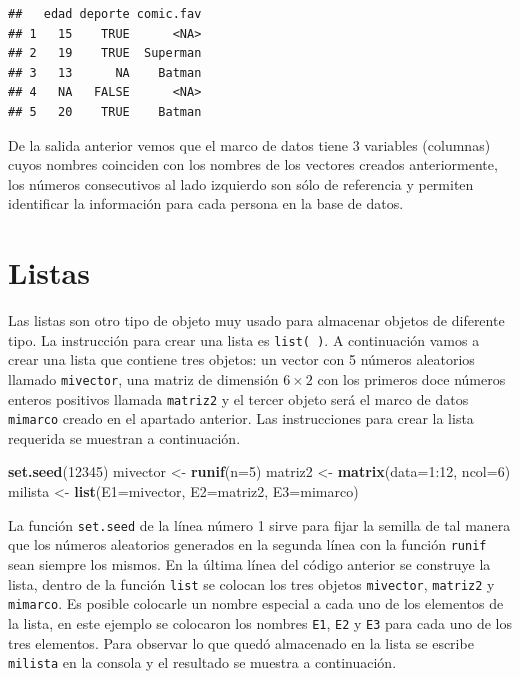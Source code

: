 \documentclass[10pt,]{krantz}
\makeatletter
\newenvironment{Shaded}{\begin{snugshade}}{\end{snugshade}}
\newcommand{\KeywordTok}[1]{\textcolor[rgb]{0.13,0.29,0.53}{\textbf{{#1}}}}
\newcommand{\DataTypeTok}[1]{\textcolor[rgb]{0.13,0.29,0.53}{{#1}}}
\newcommand{\DecValTok}[1]{\textcolor[rgb]{0.00,0.00,0.81}{{#1}}}
\newcommand{\StringTok}[1]{\textcolor[rgb]{0.31,0.60,0.02}{{#1}}}
\newcommand{\NormalTok}[1]{{#1}}
\newenvironment{kframe}{%
\medskip{}
\setlength{\fboxsep}{.8em}
 \def\at@end@of@kframe{}%
 \ifinner\ifhmode%
  \def\at@end@of@kframe{\end{minipage}}%
  \begin{minipage}{\columnwidth}%
 \fi\fi%
 \def\FrameCommand##1{\hskip\@totalleftmargin \hskip-\fboxsep
 \colorbox{shadecolor}{##1}\hskip-\fboxsep
     \hskip-\linewidth \hskip-\@totalleftmargin \hskip\columnwidth}%
 \MakeFramed {\advance\hsize-\width
   \@totalleftmargin\z@ \linewidth\hsize
   \@setminipage}}%
 {\par\unskip\endMakeFramed%
 \at@end@of@kframe}
\renewenvironment{Shaded}{\begin{kframe}}{\end{kframe}}
\makeatother
\begin{document}
\begin{verbatim}
##   edad deporte comic.fav
## 1   15    TRUE      <NA>
## 2   19    TRUE  Superman
## 3   13      NA    Batman
## 4   NA   FALSE      <NA>
## 5   20    TRUE    Batman
\end{verbatim}

De la salida anterior vemos que el marco de datos tiene 3 variables
(columnas) cuyos nombres coinciden con los nombres de los vectores
creados anteriormente, los números consecutivos al lado izquierdo son
sólo de referencia y permiten identificar la información para cada
persona en la base de datos.

\section{\texorpdfstring{Listas 
}{Listas  }}\label{listas}

Las listas son otro tipo de objeto muy usado para almacenar objetos de
diferente tipo. La instrucción para crear una lista es
\texttt{list(\ )}. A continuación vamos a crear una lista que contiene
tres objetos: un vector con 5 números aleatorios llamado
\texttt{mivector}, una matriz de dimensión \(6 \times 2\) con los
primeros doce números enteros positivos llamada \texttt{matriz2} y el
tercer objeto será el marco de datos \texttt{mimarco} creado en el
apartado anterior. Las instrucciones para crear la lista requerida se
muestran a continuación.

\begin{Shaded}
\begin{Highlighting}[]
\KeywordTok{set.seed}\NormalTok{(}\DecValTok{12345}\NormalTok{)}
\NormalTok{mivector <-}\StringTok{ }\KeywordTok{runif}\NormalTok{(}\DataTypeTok{n=}\DecValTok{5}\NormalTok{)}
\NormalTok{matriz2 <-}\StringTok{ }\KeywordTok{matrix}\NormalTok{(}\DataTypeTok{data=}\DecValTok{1}\NormalTok{:}\DecValTok{12}\NormalTok{, }\DataTypeTok{ncol=}\DecValTok{6}\NormalTok{)}
\NormalTok{milista <-}\StringTok{ }\KeywordTok{list}\NormalTok{(}\DataTypeTok{E1=}\NormalTok{mivector, }\DataTypeTok{E2=}\NormalTok{matriz2, }\DataTypeTok{E3=}\NormalTok{mimarco)}
\end{Highlighting}
\end{Shaded}

La función \texttt{set.seed} de la línea número 1 sirve para fijar la
semilla de tal manera que los números aleatorios generados en la segunda
línea con la función \texttt{runif} sean siempre los mismos. En la
última línea del código anterior se construye la lista, dentro de la
función \texttt{list} se colocan los tres objetos \texttt{mivector},
\texttt{matriz2} y \texttt{mimarco}. Es posible colocarle un nombre
especial a cada uno de los elementos de la lista, en este ejemplo se
colocaron los nombres \texttt{E1}, \texttt{E2} y \texttt{E3} para cada
uno de los tres elementos. Para observar lo que quedó almacenado en la
lista se escribe \texttt{milista} en la consola y el resultado se
muestra a continuación.
\end{document}
